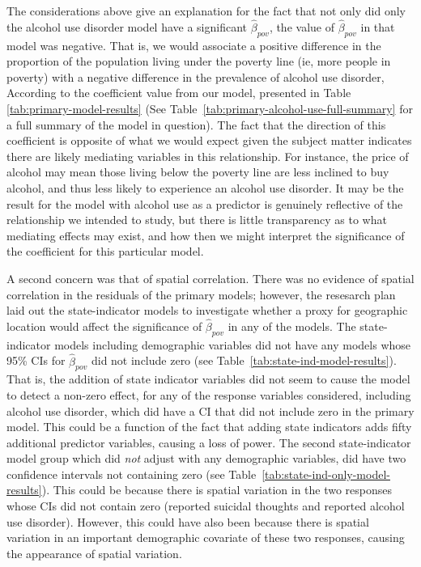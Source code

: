 \documentclass{article}
\begin{document}
The considerations above give an explanation for the fact that
not only did only the alcohol use disorder model have a
significant $\hat{\beta}_{pov}$, the value of $\hat{\beta}_{pov}$
in that model was negative.
That is, we would associate a positive difference in
the proportion of the population living under the poverty line
(ie, more people in poverty)
with a negative difference in the prevalence of alcohol use disorder,
According to the coefficient value from our model, presented in
Table \ref{tab:primary-model-results}
(See Table~\ref{tab:primary-alcohol-use-full-summary} for a full
summary of the model in question).
The fact that the direction of this coefficient is opposite of
what we would expect given the subject matter
indicates there are likely mediating variables in this relationship.
For instance, the price of alcohol may mean those living below
the poverty line are less inclined to buy alcohol,
and thus less likely to experience an alcohol use disorder.
It may be the result for the model with alcohol use as
a predictor is genuinely reflective of the relationship
we intended to study, but there is little transparency
as to what mediating effects may exist,
and how then we might interpret the significance of
the coefficient for this particular model.

A second concern was that of spatial correlation.
There was no evidence of spatial correlation in the residuals
of the primary models;
however, the resesarch plan laid out the state-indicator
models to investigate whether a proxy for geographic
location would affect the significance of
$\hat{\beta}_{pov}$
in any of the models.
The state-indicator models including demographic variables
did not have any models whose 95\% CIs for
$\hat{\beta}_{pov}$
did not include zero
(see Table~\ref{tab:state-ind-model-results}).
That is, the addition of state indicator variables did
not seem to cause the model to detect a non-zero effect,
for any of the response variables considered,
including alcohol use disorder, which did have a
CI that did not include zero in the primary model.
This could be a function of the fact that adding
state indicators adds fifty additional predictor
variables, causing a loss of power.
The second state-indicator model group
which did \textit{not} adjust with any demographic variables,
did have two confidence intervals not containing zero
(see Table~\ref{tab:state-ind-only-model-results}).
This could be because there is spatial variation
in the two responses whose CIs did not contain zero
(reported suicidal thoughts and reported alcohol use disorder).
However, this could have also been because there is
spatial variation in an important demographic covariate of
these two responses, causing the appearance of spatial variation.
\end{document}
